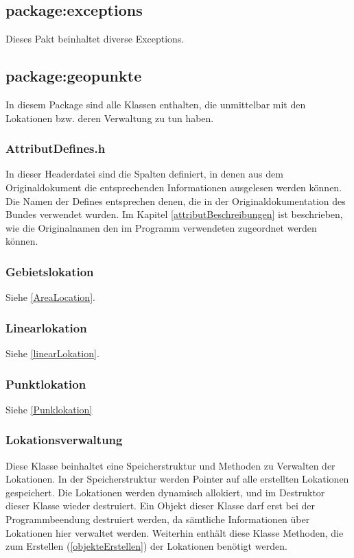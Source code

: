 \documentclass[12pt, a4paper, ngerman]{article}
\begin{document}
\subsection{package:exceptions}
Dieses Pakt beinhaltet diverse Exceptions. 

\subsection{package:geopunkte}
In diesem Package sind alle Klassen enthalten, die unmittelbar mit den Lokationen bzw. deren Verwaltung zu tun haben.
\subsubsection{AttributDefines.h}
In dieser Headerdatei sind die Spalten definiert, in denen aus dem Originaldokument die entsprechenden Informationen ausgelesen werden können. Die Namen der Defines entsprechen denen, die in der Originaldokumentation des Bundes verwendet wurden. Im Kapitel \ref{attributBeschreibungen} ist beschrieben, wie die Originalnamen den im Programm verwendeten zugeordnet werden können. 

\subsubsection{Gebietslokation \label{class:Gebietslokation}}
Siehe \ref{AreaLocation}.

\subsubsection{Linearlokation \label{class:Linearlokation}}
Siehe \ref{linearLokation}.

\subsubsection{Punktlokation \label{class:Punktlokation}}
Siehe \ref{Punklokation}

\subsubsection{Lokationsverwaltung}
Diese Klasse beinhaltet eine Speicherstruktur und Methoden zu Verwalten der Lokationen. In der Speicherstruktur werden Pointer auf alle erstellten Lokationen gespeichert. Die Lokationen werden dynamisch allokiert, und im Destruktor dieser Klasse wieder destruiert. Ein Objekt dieser Klasse darf erst bei der Programmbeendung destruiert werden, da sämtliche Informationen über Lokationen hier verwaltet werden. Weiterhin enthält diese Klasse Methoden, die zum Erstellen (\ref{objekteErstellen}) der Lokationen benötigt werden.
\end{document}
